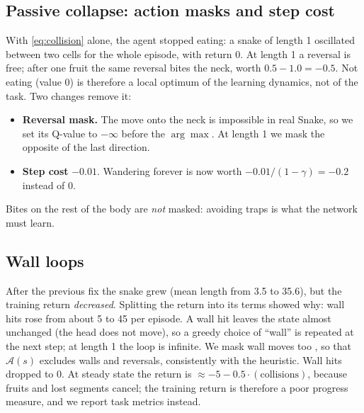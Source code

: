 \documentclass{article}
\begin{document}

\subsection{Passive collapse: action masks and step cost}
\label{sec:collapse}
With \eqref{eq:collision} alone, the agent stopped eating: a snake of length 1 oscillated between two cells for the whole episode, with return 0.
At length 1 a reversal is free; after one fruit the same reversal bites the neck, worth $0.5-1.0=-0.5$. Not eating (value 0) is therefore a local optimum of the learning dynamics, not of the task.
Two changes remove it:
\begin{itemize}
\item \textbf{Reversal mask.} The move onto the neck is impossible in real Snake, so we set its Q-value to $-\infty$ before the $\arg\max$. At length 1 we mask the opposite of the last direction.
\item \textbf{Step cost} $-0.01$. Wandering forever is now worth $-0.01/(1-\gamma)=-0.2$ instead of 0.
\end{itemize}
Bites on the rest of the body are \emph{not} masked: avoiding traps is what the network must learn.

\subsection{Wall loops}
\label{sec:walls}
After the previous fix the snake grew (mean length from 3.5 to 35.6), but the training return \emph{decreased}. Splitting the return into its terms showed why: wall hits rose from about 5 to 45 per episode.
A wall hit leaves the state almost unchanged (the head does not move), so a greedy choice of ``wall'' is repeated at the next step; at length 1 the loop is infinite.
We mask wall moves too \cite{huang2022}, so that $\mathcal{A}(s)$ excludes walls and reversals, consistently with the heuristic.
Wall hits dropped to 0. At steady state the return is $\approx -5 - 0.5\cdot(\text{collisions})$, because fruits and lost segments cancel; the training return is therefore a poor progress measure, and we report task metrics instead.
\end{document}
